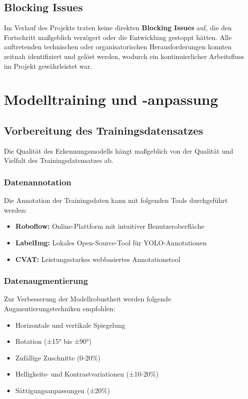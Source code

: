 \documentclass[12pt, a4paper]{scrreprt}
\begin{document}
\section{Blocking Issues}
Im Verlauf des Projekts traten keine direkten \textbf{Blocking Issues} auf, die den Fortschritt maßgeblich verzögert oder die Entwicklung gestoppt hätten. Alle auftretenden technischen oder organisatorischen Herausforderungen konnten zeitnah identifiziert und gelöst werden, wodurch ein kontinuierlicher Arbeitsfluss im Projekt gewährleistet war.

\chapter{Modelltraining und -anpassung}

\section{Vorbereitung des Trainingsdatensatzes}
Die Qualität des Erkennungsmodells hängt maßgeblich von der Qualität und Vielfalt des Trainingsdatensatzes ab.

\subsection{Datenannotation}
Die Annotation der Trainingsdaten kann mit folgenden Tools durchgeführt werden:
\begin{itemize}
    \item \textbf{Roboflow:} Online-Plattform mit intuitiver Benutzeroberfläche
    \item \textbf{LabelImg:} Lokales Open-Source-Tool für YOLO-Annotationen
    \item \textbf{CVAT:} Leistungsstarkes webbasiertes Annotationstool
\end{itemize}

\subsection{Datenaugmentierung}
Zur Verbesserung der Modellrobustheit werden folgende Augmentierungstechniken empfohlen:
\begin{itemize}
    \item Horizontale und vertikale Spiegelung
    \item Rotation (±15° bis ±90°)
    \item Zufällige Zuschnitte (0-20\%)
    \item Helligkeits- und Kontrastvariationen (±10-20\%)
    \item Sättigungsanpassungen (±20\%)
\end{itemize}
\end{document}
